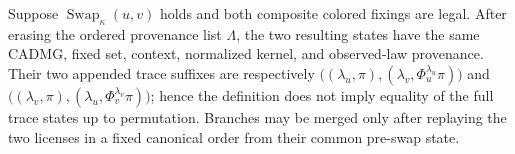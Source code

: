 Suppose \(\operatorname{Swap}_{\kappa}(u,v)\) holds and both composite colored fixings are legal. After erasing the ordered provenance list \(\Lambda\), the two resulting states have the same CADMG, fixed set, context, normalized kernel, and observed-law provenance. Their two appended trace suffixes are respectively \(\bigl((\lambda_u,\pi),(\lambda_v,\Phi_u^{\lambda_u}\pi)\bigr)\) and \(\bigl((\lambda_v,\pi),(\lambda_u,\Phi_v^{\lambda_v}\pi)\bigr)\); hence the definition does not imply equality of the full trace states up to permutation. Branches may be merged only after replaying the two licenses in a fixed canonical order from their common pre-swap state.